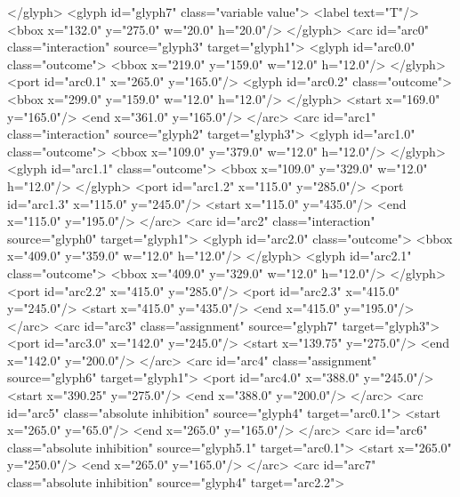 \begin{example}
        </glyph>
        <glyph id="glyph7" class="variable value">
            <label text="T"/>
            <bbox x="132.0" y="275.0" w="20.0" h="20.0"/>
        </glyph>
        <arc id="arc0" class="interaction" source="glyph3" target="glyph1">
            <glyph id="arc0.0" class="outcome">
                <bbox x="219.0" y="159.0" w="12.0" h="12.0"/>
            </glyph>
            <port id="arc0.1" x="265.0" y="165.0"/>
            <glyph id="arc0.2" class="outcome">
                <bbox x="299.0" y="159.0" w="12.0" h="12.0"/>
            </glyph>
            <start x="169.0" y="165.0"/>
            <end x="361.0" y="165.0"/>
        </arc>
        <arc id="arc1" class="interaction" source="glyph2" target="glyph3">
            <glyph id="arc1.0" class="outcome">
                <bbox x="109.0" y="379.0" w="12.0" h="12.0"/>
            </glyph>
            <glyph id="arc1.1" class="outcome">
                <bbox x="109.0" y="329.0" w="12.0" h="12.0"/>
            </glyph>
            <port id="arc1.2" x="115.0" y="285.0"/>
            <port id="arc1.3" x="115.0" y="245.0"/>
            <start x="115.0" y="435.0"/>
            <end x="115.0" y="195.0"/>
        </arc>
        <arc id="arc2" class="interaction" source="glyph0" target="glyph1">
            <glyph id="arc2.0" class="outcome">
                <bbox x="409.0" y="359.0" w="12.0" h="12.0"/>
            </glyph>
            <glyph id="arc2.1" class="outcome">
                <bbox x="409.0" y="329.0" w="12.0" h="12.0"/>
            </glyph>
            <port id="arc2.2" x="415.0" y="285.0"/>
            <port id="arc2.3" x="415.0" y="245.0"/>
            <start x="415.0" y="435.0"/>
            <end x="415.0" y="195.0"/>
        </arc>
        <arc id="arc3" class="assignment" source="glyph7" target="glyph3">
            <port id="arc3.0" x="142.0" y="245.0"/>
            <start x="139.75" y="275.0"/>
            <end x="142.0" y="200.0"/>
        </arc>
        <arc id="arc4" class="assignment" source="glyph6" target="glyph1">
            <port id="arc4.0" x="388.0" y="245.0"/>
            <start x="390.25" y="275.0"/>
            <end x="388.0" y="200.0"/>
        </arc>
        <arc id="arc5" class="absolute inhibition" source="glyph4" target="arc0.1">
            <start x="265.0" y="65.0"/>
            <end x="265.0" y="165.0"/>
        </arc>
        <arc id="arc6" class="absolute inhibition" source="glyph5.1" target="arc0.1">
            <start x="265.0" y="250.0"/>
            <end x="265.0" y="165.0"/>
        </arc>
        <arc id="arc7" class="absolute inhibition" source="glyph4" target="arc2.2">

\end{example}

